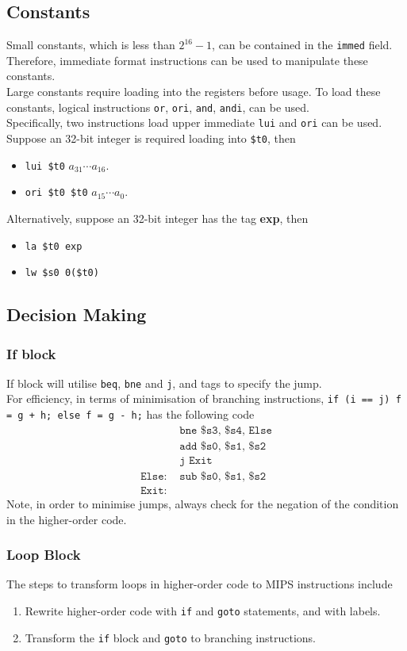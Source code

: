 \documentclass[12pt]{article}
\theoremstyle{definition}
\begin{document}
\subsection{Constants}
Small constants, which is less than $2^16-1$, can be contained in the \texttt{immed} field. Therefore, immediate format instructions can be used to manipulate these constants.\\
Large constants require loading into the registers before usage. To load these constants, logical instructions \texttt{or}, \texttt{ori}, \texttt{and}, \texttt{andi}, can be used.\\Specifically, two instructions load upper immediate \texttt{lui} and \texttt{ori} can be used. Suppose an 32-bit integer is required loading into \texttt{\$t0}, then
\begin{itemize}
  \item \texttt{lui \$t0} $a_{31}\cdots a_{16}$.
  \item \texttt{ori \$t0 \$t0} $a_{15}\cdots a_0$.
\end{itemize}
Alternatively, suppose an 32-bit integer has the tag \textbf{exp}, then
\begin{itemize}
  \item \texttt{la \$t0 exp}
  \item \texttt{lw \$s0 0(\$t0)}
\end{itemize}
\subsection{Decision Making} 
\subsubsection{If block}
If block will utilise \texttt{beq}, \texttt{bne} and \texttt{j}, and tags to specify the jump.\\
For efficiency, in terms of minimisation of branching instructions, \texttt{if (i == j) f = g + h; else f = g - h;} has the following code
\begin{align*}
&\texttt{bne \$s3, \$s4, Else}\\
&\texttt{add \$s0, \$s1, \$s2}\\
&\texttt{j Exit}\\
\texttt{Else: }&\texttt{sub \$s0, \$s1, \$s2}\\
\texttt{Exit: }&
\end{align*}
Note, in order to minimise jumps, always check for the negation of the condition in the higher-order code.
\subsubsection{Loop Block}
The steps to transform loops in higher-order code to MIPS instructions include
\begin{enumerate}
  \item Rewrite higher-order code with \texttt{if} and \texttt{goto} statements, and with labels.
  \item Transform the \texttt{if} block and \texttt{goto} to branching instructions.
\end{enumerate}
\end{document}
